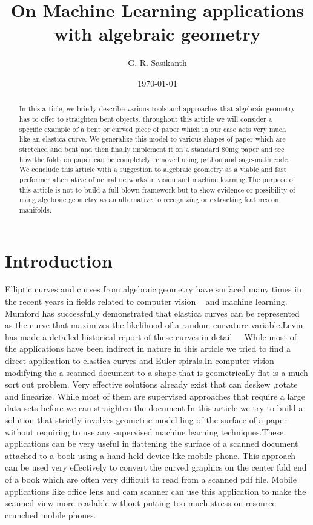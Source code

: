 \documentclass[longbibliography]{revtex4-1}
\begin{document}
\title{On Machine Learning applications with algebraic geometry}
\author{G. R. Sasikanth}
\date{\today}
\begin{abstract}
 In this article, we briefly describe various tools and approaches that algebraic geometry has to offer to straighten bent objects.
 throughout this article we will consider a specific example of a bent or curved piece of paper which in our case acts very much like an     
 elastica curve. We generalize this model to various shapes of paper which are stretched and bent and then finally implement it on 
 a standard 80mg paper and see how the folds on paper can be completely removed using python and sage-math code. We conclude this article
 with a suggestion to algebraic geometry as a viable and fast performer alternative of neural networks in vision and
 machine learning.The purpose of this article is not to build a full blown framework but to show evidence or possibility of using 
 algebraic geometry as an alternative to recognizing or extracting features on manifolds.
\end{abstract}
\maketitle

\section{Introduction}
Elliptic curves and curves from algebraic geometry have surfaced many times in the recent years in fields related to computer vision ~\cite{Mumford} and machine learning. Mumford has successfully demonstrated that elastica curves can be represented as the curve that maximizes the likelihood of a random curvature variable.Levin has made a detailed historical report of these curves in detail ~\cite{Levien} .While most of the applications have been indirect in nature in this article we tried to find a direct application to
elastica curves and Euler spirals.In computer vision modifying the a scanned document to a shape that is geometrically flat is a much sort out problem. Very effective solutions already exist that can deskew ,rotate and linearize. While most of them are supervised approaches that require a large data sets before we can straighten the document.In this article we try to build a solution that strictly involves geometric model ling of the surface of a paper without requiring to use any supervised machine learning techniques.These applications can be very useful in flattening the surface of a scanned document attached to a book using a hand-held device like mobile phone. This approach can be used very effectively to convert the curved graphics on the center fold end of a book which are often very difficult to read from a scanned pdf file. Mobile applications like office lens and cam scanner can use this application to make the scanned view more readable without putting too much stress on resource crunched mobile phones.
\end{document}
